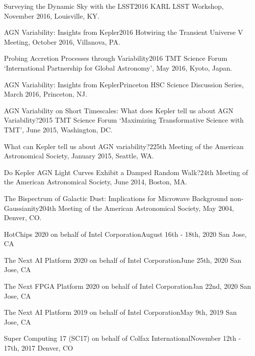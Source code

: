 \documentclass[10pt,a4paper]{article}
\begin{document}
\inlineheadsection
  {Surveying the Dynamic Sky with the LSST}{2016 KARL LSST Workshop, November 2016, Louisville, KY.}

\inlineheadsection
  {AGN Variability: Insights from Kepler}{2016 Hotwiring the Transient Universe V Meeting, October 2016, Villanova, PA.}

\inlineheadsection
  {Probing Accretion Processes through Variability}{2016 TMT Science Forum `International Partnership for Global Astronomy', May 2016, Kyoto, Japan.}

\inlineheadsection
  {AGN Variability: Insights from Kepler}{Princeton HSC Science Discussion Series, March 2016, Princeton, NJ.}

\inlineheadsection
  {AGN Variability on Short Timescales: What does Kepler tell us about AGN Variability?}{2015 TMT Science Forum `Maximizing Transformative Science with TMT', June 2015, Washington, DC.}

\inlineheadsection
  {What can Kepler tell us about AGN variability?}{225th Meeting of the American Astronomical Society, January 2015, Seattle, WA.}

\inlineheadsection
  {Do Kepler AGN Light Curves Exhibit a Damped Random Walk?}{24th Meeting of the American Astronomical Society, June 2014, Boston, MA.}

\inlineheadsection
  {The Bispectrum of Galactic Dust: Implications for Microwave Background non-Gaussianity}{204th Meeting of the American Astronomical Society, May 2004, Denver, CO.}

\spacedhrule{2.0em}{0.2em}


\inlineheadsection
  {HotChips 2020 on behalf of Intel Corporation}{August 16th - 18th, 2020 San Jose, CA}

\inlineheadsection
  {The Next AI Platform 2020 on behalf of Intel Corporation}{June 25th, 2020 San Jose, CA}

  \inlineheadsection
    {The Next FPGA Platform 2020 on behalf of Intel Corporation}{Jan 22nd, 2020 San Jose, CA}

\inlineheadsection
  {The Next AI Platform 2019 on behalf of Intel Corporation}{May 9th, 2019 San Jose, CA}

\inlineheadsection
  {Super Computing 17 (SC17) on behalf of Colfax International}{November 12th - 17th, 2017 Denver, CO}
\end{document}
